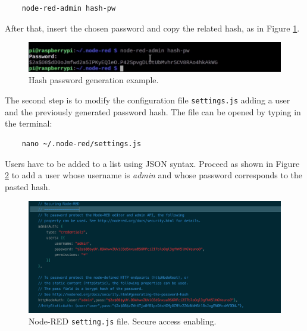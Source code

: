 \begin{verbatim}
    node-red-admin hash-pw
\end{verbatim}

\noindent
After that, insert the chosen password and copy the related hash, as in Figure \ref{hash_production}.

\begin{figure}[H]
	\begin{center}
		\includegraphics[width=1.0\textwidth]{./pictures/node-red_hash_password}
		\caption{Hash password generation example.}
		\label{hash_production}
	\end{center}
\end{figure}

\noindent
The second step is to modify the configuration file \texttt{settings.js} adding a user and the previously generated password hash. The file can be opened by typing in the terminal:

\begin{verbatim}
    nano ~/.node-red/settings.js
\end{verbatim}

\noindent
Users have to be added to a list using JSON syntax. Proceed as shown in Figure \ref{secure_settings} to add a user whose username is \textit{admin} and whose password corresponds to the pasted hash.

\begin{figure}[H]
	\begin{center}
		\includegraphics[width=1.0\textwidth]{./pictures/node-red-secure}
		\caption{Node-RED \texttt{setting.js} file. Secure access enabling.}
		\label{secure_settings}
	\end{center}
\end{figure}

